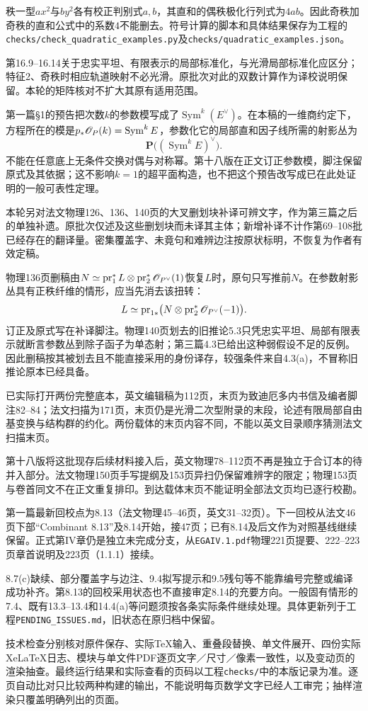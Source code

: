 秩一型$ax^2$与$by^2$各有校正判别式$a,b$，其直和的偶秩极化行列式为$4ab$。因此奇秩加奇秩的直和公式中的系数$4$不能删去。符号计算的脚本和具体结果保存为工程的\texttt{checks/check\_quadratic\_examples.py}及\texttt{checks/quadratic\_examples.json}。

第16.9--16.14关于忠实平坦、有限表示的局部标准化，与光滑局部标准化应区分；特征2、奇秩时相应轨道映射不必光滑。原批次对此的双数计算作为译校说明保留。本轮的矩阵核对不扩大其原有适用范围。

第一篇§1的预告把次数$k$的参数模写成了$\operatorname{Sym}^k(E^\vee)$。在本稿的一维商约定下，方程所在的模是$p_*\mathscr O_P(k)=\operatorname{Sym}^k E$，参数化它的局部直和因子线所需的射影丛为
\[
 \mathbf P\bigl((\operatorname{Sym}^k E)^\vee\bigr).
\]
不能在任意底上无条件交换对偶与对称幂。第十八版在正文订正参数模，脚注保留原式及其依据；这不影响$k=1$的超平面构造，也不把这个预告改写成已在此处证明的一般可表性定理。

本轮另对法文物理126、136、140页的大叉删划块补译可辨文字，作为第三篇之后的单独补遗。原批次仅述及这些删划块而未译其主体；新增补译不计作第69--108批已经存在的翻译量。密集覆盖字、未竟句和难辨边注按原状标明，不恢复为作者有效定稿。

物理136页删稿由$N\simeq\operatorname{pr}_1^*L\otimes\operatorname{pr}_2^*\mathscr O_{P^\vee}(1)$恢复$L$时，原句只写推前$N$。在参数射影丛具有正秩纤维的情形，应当先消去该扭转：
\[
 L\simeq\operatorname{pr}_{1*}
 \bigl(N\otimes\operatorname{pr}_2^*\mathscr O_{P^\vee}(-1)\bigr).
\]
订正及原式写在补译脚注。物理140页划去的旧推论5.3只凭忠实平坦、局部有限表示就断言参数丛到除子函子为单态射；第三篇4.3已给出这种弱假设不足的反例。因此删稿按其被划去且不能直接采用的身份译存，较强条件来自4.3(a)，不冒称旧推论原本已经具备。

已实际打开两份完整底本，英文编辑稿为112页，末页为致迪厄多内书信及编者脚注82--84；法文扫描为171页，末页仍是光滑二次型附录的末段，论述有限局部自由基变换与结构群的约化。两份载体的末页内容不同，不能以英文目录顺序猜测法文扫描末页。

第十八版将这批现存后续材料接入后，英文物理78--112页不再是独立于合订本的待并入部分。法文物理150页手写提纲及153页异扫仍保留难辨字的限定；物理153页与卷首同文不在正文重复排印。到达载体末页不能证明全部法文页均已逐行校勘。

第一篇最新回校点为8.13（法文物理45--46页，英文31--32页）。下一回校从法文46页下部“Combinant 8.13”及8.14开始，接47页；已有8.14及后文作为对照基线继续保留。正式第IV章仍是独立未完成分支，从\texttt{EGAIV.1.pdf}物理221页提要、222--223页章首说明及223页（1.1.1）接续。

8.7(c)缺续、部分覆盖字与边注、9.4拟写提示和9.5残句等不能靠编号完整或编译成功补齐。第8.13的回校采用状态也不直接审定8.14的充要方向。一般固有情形的7.4、既有13.3--13.4和14.4(a)等问题须按各条实际条件继续处理。具体更新列于工程\texttt{PENDING\_ISSUES.md}，旧状态在原归档中保留。

技术检查分别核对原件保存、实际TeX输入、重叠段替换、单文件展开、四份实际XeLaTeX日志、模块与单文件PDF逐页文字／尺寸／像素一致性，以及变动页的渲染抽查。最终运行结果和实际查看的页码以工程\texttt{checks/}中的本版记录为准。逐页自动比对只比较两种构建的输出，不能说明每页数学文字已经人工审完；抽样渲染只覆盖明确列出的页面。
